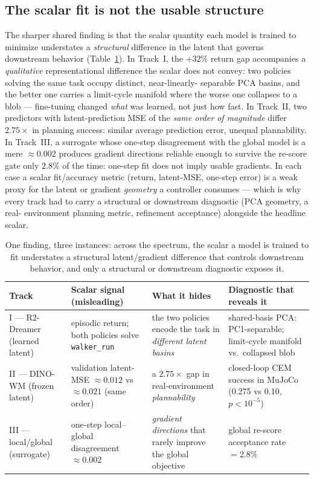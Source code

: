 \documentclass[11pt,a4paper]{article}
\begin{document}
\subsection{The scalar fit is not the usable structure}
\label{sec:synthesis-structure}

The sharper shared finding is that the scalar quantity each model is trained to
minimize understates a \emph{structural} difference in the latent that governs
downstream behavior (Table~\ref{tab:synthesis}). In Track~I, the $+32\%$ return
gap accompanies a \emph{qualitative} representational difference the scalar does
not convey: two policies solving the same task occupy distinct, near-linearly-
separable PCA basins, and the better one carries a limit-cycle manifold where
the worse one collapses to a blob --- fine-tuning changed \emph{what} was
learned, not just how fast. In Track~II, two predictors with latent-prediction
MSE of the \emph{same order of magnitude} differ $2.75\times$ in planning
success: similar average prediction error, unequal plannability. In Track~III, a surrogate whose
one-step disagreement with the global model is a mere ${\approx}0.002$ produces
gradient directions reliable enough to survive the re-score gate only $2.8\%$ of
the time: one-step fit does not imply usable gradients. In each case a scalar
fit/accuracy metric (return, latent-MSE, one-step error) is a weak proxy for the
latent or gradient \emph{geometry} a controller consumes --- which is why every
track had to carry a structural or downstream diagnostic (PCA geometry, a real-
environment planning metric, refinement acceptance) alongside the headline
scalar.

\begin{table}[h]
\centering\small
\setlength{\tabcolsep}{5pt}
\begin{tabular}{@{}p{2.5cm}p{3.4cm}p{3.7cm}p{4.6cm}@{}}
\toprule
\textbf{Track} & \textbf{Scalar signal (misleading)} & \textbf{What it hides} & \textbf{Diagnostic that reveals it} \\
\midrule
I — R2-Dreamer (learned latent) &
episodic return; both policies solve \texttt{walker\_run} &
the two policies encode the task in \emph{different latent basins} &
shared-basis PCA: PC1-separable; limit-cycle manifold vs.\ collapsed blob \\
\addlinespace
II — DINO-WM (frozen latent) &
validation latent-MSE $\approx\!0.012$ vs $\approx\!0.021$ (same order) &
a $2.75\times$ gap in real-environment \emph{plannability} &
closed-loop CEM success in MuJoCo (0.275 vs 0.10, $p{<}10^{-5}$) \\
\addlinespace
III — local/global (surrogate) &
one-step local--global disagreement $\approx\!0.002$ &
\emph{gradient directions} that rarely improve the global objective &
global re-score acceptance rate $=2.8\%$ \\
\bottomrule
\end{tabular}
\caption{One finding, three instances: across the spectrum, the scalar a model
is trained to fit understates a structural latent/gradient difference that
controls downstream behavior, and only a structural or downstream diagnostic
exposes it.}
\label{tab:synthesis}
\end{table}
\end{document}
